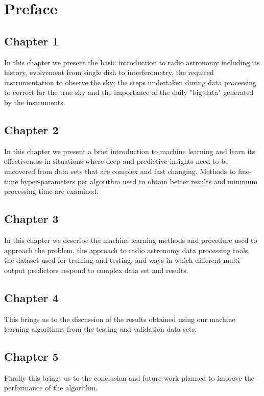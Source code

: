 \chapter*{Preface}

\section*{Chapter 1}
In this chapter we present the basic introduction to radio astronomy including its history, evolvement from single dish to interferometry, the required instrumentation to observe the sky; the steps undertaken during data processing to correct for the true sky and the importance of the daily "big data" generated by the instruments.    
\section*{Chapter 2}
In this chapter we present a brief introduction to machine learning and learn its effectiveness in situations where deep and predictive insights need to be uncovered from data sets that are complex and fast changing. Methods to fine-tune hyper-parameters per algorithm used to obtain better results and minimum processing time are examined.  
\section*{Chapter 3}
In this chapter we describe the machine learning methods and procedure used to approach the problem, the approach to radio astronomy data processing tools, the dataset used for training and testing, and ways in which different multi-output predictors respond to complex data set and results.
\section*{Chapter 4}
This brings us to the discussion of the results obtained using our machine learning algorithms from the testing and validation data sets. 
\section*{Chapter 5}
Finally this brings us to the conclusion and future work planned to improve the performance of the algorithm.

